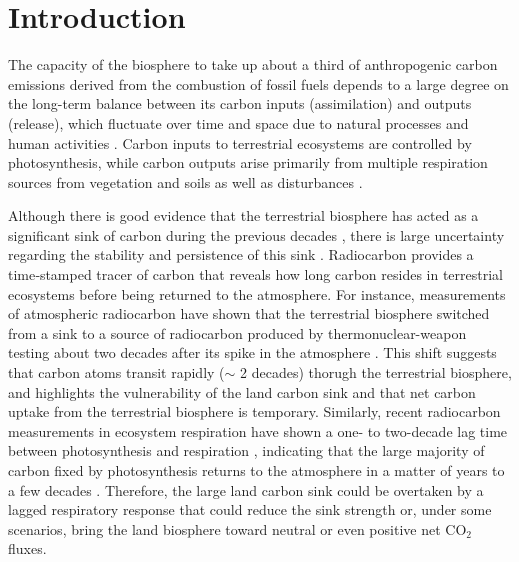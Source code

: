 \documentclass[ProofPDF]{./Styles/Jnls-Template-V3}
\begin{document}
\maketitle
\linenumbers

\section{Introduction}
The capacity of the biosphere to take up about a third of anthropogenic carbon emissions derived from the combustion of fossil fuels \citep{Ruehr2023,Friedlingstein2025} depends to a large degree on the long-term balance between its carbon inputs (assimilation) and outputs (release), which fluctuate over time and space due to natural processes and human activities \citep{Malhi1999}. Carbon inputs to terrestrial ecosystems are controlled by photosynthesis, while carbon outputs arise primarily from multiple respiration sources from vegetation and soils as well as disturbances \citep{Wisniewski1993, Trumbore2006}. 

Although there is good evidence that the terrestrial biosphere has acted as a significant sink of carbon during the previous decades \citep{Walker2021,Ruehr2023,Sitch2024}, there is large uncertainty regarding the stability and persistence of this sink \citep{Canadell2007,Fernandez-Martinez2023}. Radiocarbon provides a time‑stamped tracer of carbon that reveals how long carbon resides in terrestrial ecosystems before being returned to the atmosphere. For instance, measurements of atmospheric radiocarbon have shown that the terrestrial biosphere switched from a sink to a source of radiocarbon produced by thermonuclear-weapon testing about two decades after its spike in the atmosphere \citep{Naegler2009,Levin2022}. This shift suggests that carbon atoms transit rapidly ($\sim$ 2 decades) thorugh the terrestrial biosphere, and highlights the vulnerability of the land carbon sink and that net carbon uptake from the terrestrial biosphere is temporary. Similarly, recent radiocarbon measurements in ecosystem respiration have shown a one- to two-decade lag time between photosynthesis and respiration \citep{Tangarife2024JGR,Chanca2025,Sierra2026CCCR}, indicating that the large majority of carbon fixed by photosynthesis returns to the atmosphere in a matter of years to a few decades \citep{Sierra2023PTRS}. Therefore, the large land carbon sink could be overtaken by a lagged respiratory response that could reduce the sink strength or, under some scenarios, bring the land biosphere toward neutral or even positive net CO$_2$ fluxes.
\end{document}
